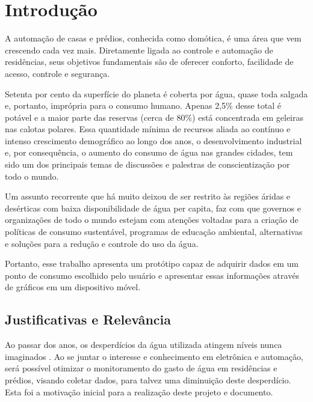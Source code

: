 \chapter[Introdução]{Introdução}

A automação de casas e prédios, conhecida como domótica, é uma área que vem crescendo cada vez mais. Diretamente ligada ao controle e automação de residências, seus objetivos fundamentais são de oferecer conforto, facilidade de acesso, controle e segurança.\cite{teza2002alguns}

Setenta por cento da superfície do planeta é coberta por água, quase toda salgada e, portanto, imprópria para o consumo humano. Apenas 2,5\% desse total é potável e a maior parte das reservas (cerca de 80\%) está concentrada em geleiras nas calotas polares. 
Essa quantidade mínima de recursos aliada ao contínuo e intenso crescimento demográfico ao longo dos anos, o desenvolvimento industrial e, por consequência, o aumento do consumo de água nas grandes cidades, tem sido um dos principais temas de discussões e palestras de conscientização por todo o mundo.\cite{aguaconsumo}

Um assunto recorrente que há muito deixou de ser restrito às regiões áridas e desérticas com baixa disponibilidade de água per capita, faz com que governos e organizações de todo o mundo estejam com atenções voltadas para a criação de políticas de consumo sustentável, programas de educação ambiental, alternativas e soluções para a redução e controle do uso da água.\cite{ferreirasistema} 

Portanto, esse trabalho apresenta um protótipo capaz de adquirir dados em um ponto de consumo escolhido pelo usuário e apresentar essas informações através de gráficos em um dispositivo móvel.


\section{Justificativas e Relev{\^a}ncia}
%
Ao passar dos anos, os desperdícios da água utilizada atingem níveis nunca imaginados \cite{rebouccas2003agua}. Ao se juntar o interesse e conhecimento em eletrônica e automação, será possível otimizar o monitoramento do gasto de água em residências e prédios, visando coletar dados, para talvez uma diminuição deste desperdício. Esta foi a motivação inicial para a realização deste projeto e documento.
%
